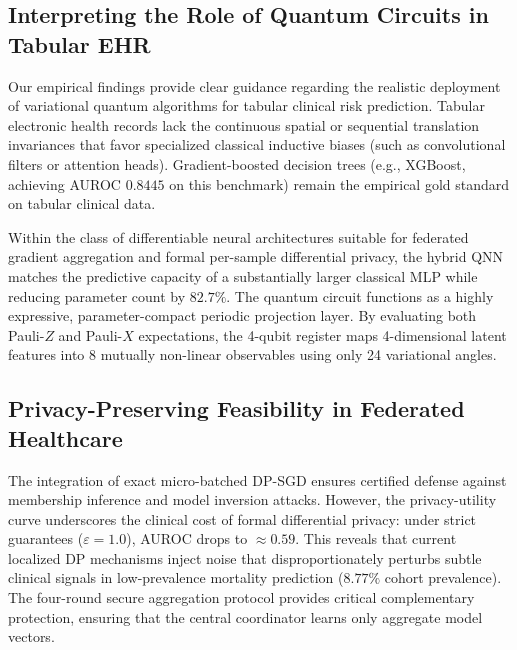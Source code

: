 \documentclass[conference]{IEEEtran}
\begin{document}
\subsection{Interpreting the Role of Quantum Circuits in Tabular EHR}
Our empirical findings provide clear guidance regarding the realistic deployment of variational quantum algorithms for tabular clinical risk prediction. Tabular electronic health records lack the continuous spatial or sequential translation invariances that favor specialized classical inductive biases (such as convolutional filters or attention heads). Gradient-boosted decision trees (e.g., XGBoost, achieving AUROC $0.8445$ on this benchmark) remain the empirical gold standard on tabular clinical data.

Within the class of differentiable neural architectures suitable for federated gradient aggregation and formal per-sample differential privacy, the hybrid QNN matches the predictive capacity of a substantially larger classical MLP while reducing parameter count by $82.7\%$. The quantum circuit functions as a highly expressive, parameter-compact periodic projection layer. By evaluating both Pauli-$Z$ and Pauli-$X$ expectations, the 4-qubit register maps 4-dimensional latent features into 8 mutually non-linear observables using only 24 variational angles.

\subsection{Privacy-Preserving Feasibility in Federated Healthcare}
The integration of exact micro-batched DP-SGD ensures certified defense against membership inference and model inversion attacks. However, the privacy-utility curve underscores the clinical cost of formal differential privacy: under strict guarantees ($\varepsilon = 1.0$), AUROC drops to $\approx 0.59$. This reveals that current localized DP mechanisms inject noise that disproportionately perturbs subtle clinical signals in low-prevalence mortality prediction ($8.77\%$ cohort prevalence). The four-round secure aggregation protocol provides critical complementary protection, ensuring that the central coordinator learns only aggregate model vectors.
\end{document}
